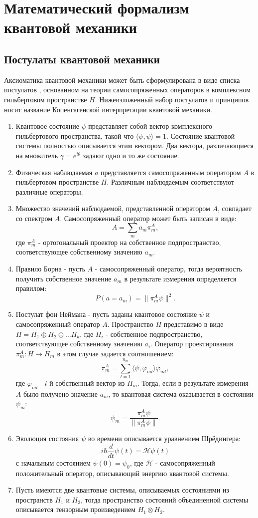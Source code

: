 \documentclass[%
master,         %
subf,           %
href,           %
,times         %
]{disser}
\numberwithin{equation}{section}
\numberwithin{figure}{section}
\begin{document}
\section{Математический формализм квантовой механики}
\subsection{Постулаты квантовой механики}
Аксиоматика квантовой механики может быть сформулирована в виде списка постулатов \cite{Khrennikov_information}, основанном на теории самосопряженных операторов в комплексном гильбертовом пространстве $H$. Нижеизложенный набор постулатов и принципов носит название Копенгагенской интерпретации квантовой механики.
\begin{enumerate}[label=\bfseries Постулат \arabic*:, align=left]
  \item Квантовое состояние $\psi$ представляет собой вектор комплексного гильбертового пространства, такой что $\langle\psi, \psi\rangle = 1$. Состояние квантовой системы полностью описывается этим вектором. Два вектора, различающиеся на множитель $\gamma = e^{i\theta}$ задают одно и то же состояние.
  \item Физическая наблюдаемая $a$ представляется самосопряженным оператором $A$ в гильбертовом пространстве $H$. Различным наблюдаемым соответствуют различные операторы.
  \item Множество значений наблюдаемой, представленной оператором $A$, совпадает со спектром $A$. Самосопряженный оператор может быть записан в виде:
  \[
  A = \sum_m a_m\pi_m^A,
  \]
    где $\pi_m^A$ - ортогональный проектор на собственное подпространство, соответствующее собственному значению $a_m$.
  \item Правило Борна - пусть $A$ - самосопряженный оператор, тогда вероятность получить собственное значение $a_m$ в результате измерения определяется правилом:
  \[
  P(a = a_m) = \| \pi_m^A\psi\|^2.
  \]
  \item Постулат фон Неймана - пусть заданы квантовое состояние $\psi$ и самосопряженный оператор $A$. Пространство $H$ представимо в виде $H = H_1\oplus H_2\oplus\ldots H_k$, где $H_i$ - собственное подпространство, соответствующее собственному значению $a_i$. Оператор проектирования $\pi_m^A: H\to H_m$ в этом случае задается соотношением: 
  \[
  \pi_m^A = \sum_{l = 1}^{n_m}\langle\psi,\varphi_{ml}\rangle\varphi_{ml},
  \]
  где $\varphi_{ml}$ - $l$-й собственный вектор из $H_m$.
  Тогда, если в результате измерения $A$  было получено значение $a_m$, то квантовая система оказывается в состоянии $\psi_m$:
  \[
  \psi_m = \frac{\pi_m^A\psi}{ \| \pi_m^A\psi\|}.
  \] 
  \item Эволюция состояния $\psi$ во времени описывается уравнением Шрёдингера:
  \[
  i\hbar \dfrac{d}{dt}\psi(t) = \mathcal{\mathcal{H}}\psi(t)
  \] 
  с начальным состоянием $\psi(0) = \psi_0$, 
  где $\mathcal{H}$  - самосопряженный положительный оператор, описывающий энергию квантовой системы. 
  \item Пусть имеются две квантовые системы, описываемых состояниями из пространств $H_1$ и $H_2$, тогда пространство состояний объединенной системы описывается тензорным произведением $H_1 \otimes H_2$.  
\end{enumerate}
\end{document}
